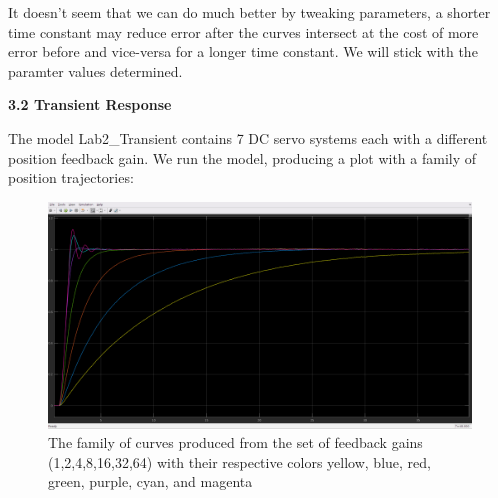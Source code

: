 \documentclass[11pt,a4paper]{article}
\begin{document}
It doesn't seem that we can do much better by tweaking parameters, a shorter time constant may reduce error after the curves intersect  at the cost of more error before and vice-versa for a longer time constant. We will stick with the paramter values determined.

\textbf{3.2 Transient Response}

	The model Lab2\_Transient contains 7 DC servo systems each with a different position feedback gain. We run the model, producing a plot with a family of position trajectories:
	
\begin{figure}[here]
\includegraphics[width=\textwidth]{imglab/lab2sol_transfam.png}
\caption{The family of curves produced from the set of feedback gains (1,2,4,8,16,32,64) with their respective colors yellow, blue, red, green, purple, cyan, and magenta }
\label{fig:transfam}
\end{figure}
\end{document}
